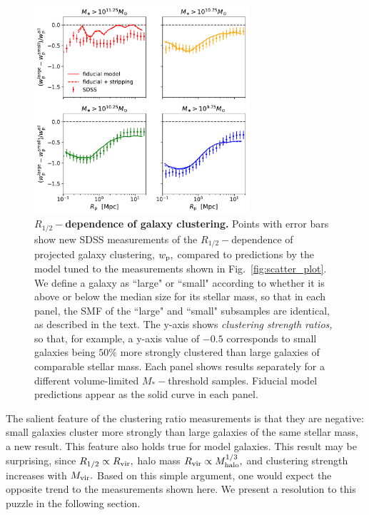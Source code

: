 \documentclass[usenatbib,usegraphicx,letterpaper]{mn2e}
\newcommand{\rhalf}{R_{1/2}}
\newcommand{\mstar}{M_{\ast}}
\newcommand{\mvir}{M_{\rm vir}}
\newcommand{\mhalo}{M_{\rm halo}}
\newcommand{\rvir}{R_{\rm vir}}
\newcommand{\wproj}{w_{\rm p}}
\begin{document}
\begin{figure}
\centering
\includegraphics[width=8cm]{FIGS/size_clustering_ratios_stripping_model_vs_sdss.pdf}
\caption{
{\bf $\rhalf-$dependence of galaxy clustering.}
Points with error bars show new SDSS measurements of the $\rhalf-$dependence of projected galaxy clustering, $\wproj,$ compared to predictions by the model tuned to the measurements shown in Fig.~\ref{fig:scatter_plot}. We define a galaxy as ``large" or ``small" according to whether it is above or below the median size for its stellar mass, so that in each panel, the SMF of the ``large" and ``small" subsamples are identical, as described in the text. The y-axis shows {\em clustering strength ratios,} so that, for example, a y-axis value of $-0.5$ corresponds to small galaxies being $50\%$ more strongly clustered than large galaxies of comparable stellar mass. Each panel shows results separately for a different volume-limited $\mstar-$threshold samples. Fiducial model predictions appear as the solid curve in each panel.
}
\label{fig:clustering_ratio_upshot}
\end{figure}

The salient feature of the clustering ratio measurements is that they are negative: small galaxies cluster more strongly than large galaxies of the same stellar mass, a new result. This feature also holds true for model galaxies. This result may be surprising, since $\rhalf\propto\rvir,$ halo mass $\rvir\propto\mhalo^{1/3},$ and clustering strength increases with $\mvir.$ Based on this simple argument, one would expect the opposite trend to the measurements shown here. We present a resolution to this puzzle in the following section. 
\end{document}
